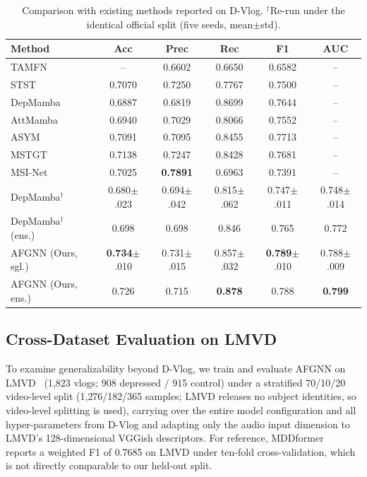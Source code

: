 \documentclass[conference]{IEEEtran}
\begin{document}
\begin{table}[!t]
\centering
\caption{Comparison with existing methods reported on D-Vlog. $^\dagger$Re-run under the identical official split (five seeds, mean$\pm$std).}
\label{tab:comparison}
\scriptsize
\setlength{\tabcolsep}{1.5pt}
\begin{tabular}{lccccc}
\hline
Method & Acc & Prec & Rec & F1 & AUC \\
\hline
TAMFN~\cite{model:TAMFN} & -- & 0.6602 & 0.6650 & 0.6582 & -- \\
STST~\cite{model:STST} & 0.7070 & 0.7250 & 0.7767 & 0.7500 & -- \\
DepMamba~\cite{model:DepMamba} & 0.6887 & 0.6819 & 0.8699 & 0.7644 & -- \\
AttMamba~\cite{model:AttMamba} & 0.6940 & 0.7029 & 0.8066 & 0.7552 & -- \\
ASYM~\cite{model:ASYM} & 0.7091 & 0.7095 & 0.8455 & 0.7713 & -- \\
MSTGT~\cite{model:MSTGT} & 0.7138 & 0.7247 & 0.8428 & 0.7681 & -- \\
MSI-Net~\cite{model:MSI-Net} & 0.7025 & \textbf{0.7891} & 0.6963 & 0.7391 & -- \\
\hline
DepMamba$^\dagger$ & 0.680{\scriptsize$\pm$.023} & 0.694{\scriptsize$\pm$.042} & 0.815{\scriptsize$\pm$.062} & 0.747{\scriptsize$\pm$.011} & 0.748{\scriptsize$\pm$.014} \\
DepMamba$^\dagger$ (ens.) & 0.698 & 0.698 & 0.846 & 0.765 & 0.772 \\
AFGNN (Ours, sgl.) & \textbf{0.734}{\scriptsize$\pm$.010} & 0.731{\scriptsize$\pm$.015} & 0.857{\scriptsize$\pm$.032} & \textbf{0.789}{\scriptsize$\pm$.010} & 0.788{\scriptsize$\pm$.009} \\
AFGNN (Ours, ens.) & 0.726 & 0.715 & \textbf{0.878} & 0.788 & \textbf{0.799} \\
\hline
\end{tabular}
\end{table}

\subsection{Cross-Dataset Evaluation on LMVD}

To examine generalizability beyond D-Vlog, we train and evaluate AFGNN on LMVD~\cite{he2024lmvd} (1{,}823 vlogs; 908 depressed / 915 control) under a stratified 70/10/20 video-level split (1{,}276/182/365 samples; LMVD releases no subject identities, so video-level splitting is used), carrying over the entire model configuration and all hyper-parameters from D-Vlog and adapting only the audio input dimension to LMVD's 128-dimensional VGGish descriptors. For reference, MDDformer~\cite{he2024lmvd} reports a weighted F1 of 0.7685 on LMVD under ten-fold cross-validation, which is not directly comparable to our held-out split.
\end{document}
